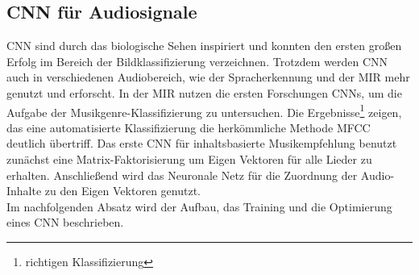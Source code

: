 \documentclass[twosided,a4,10pt]{article}
\begin{document}
\begin{multicols}{2}
		\section{CNN für Audiosignale}
		CNN sind durch das biologische Sehen inspiriert und konnten den ersten großen Erfolg im Bereich der Bildklassifizierung \cite{alex} verzeichnen. Trotzdem werden CNN auch in verschiedenen Audiobereich, wie der Spracherkennung \cite{graves} und der MIR mehr genutzt und erforscht.\newline
		In der MIR nutzen die ersten Forschungen CNNs, um die Aufgabe der Musikgenre-Klassifizierung \cite{lee} zu untersuchen. Die Ergebnisse\footnote[5]{richtigen Klassifizierung} zeigen, das eine automatisierte Klassifizierung die herkömmliche Methode MFCC deutlich übertriff. Das erste CNN für inhaltsbasierte Musikempfehlung \cite{oord} benutzt zunächst eine Matrix-Faktorisierung um Eigen Vektoren für alle Lieder zu erhalten. Anschließend wird  das Neuronale Netz für die Zuordnung der Audio-Inhalte zu den Eigen Vektoren genutzt. \cite{wang}\newline\\
		Im nachfolgenden Absatz wird der Aufbau, das Training und die Optimierung eines CNN beschrieben.
		
		

\end{multicols}
\end{document}

